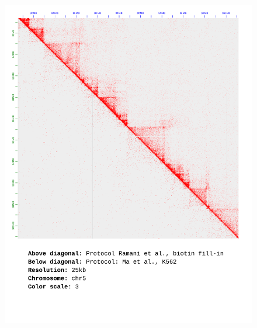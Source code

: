 \documentclass[a4paper,14pt]{extarticle}
\begin{document}
\begin{figure}[hp!] \includegraphics[width=1\textwidth]{s5_s30_chr5_25kb_3.pdf} \end{figure}
\end{document}
